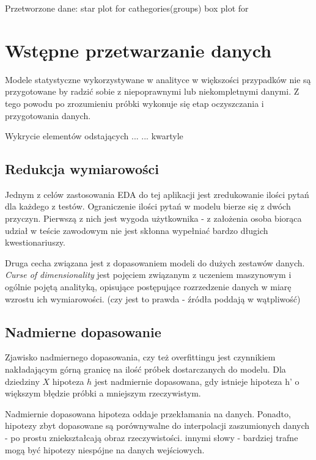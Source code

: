 \documentclass[12pt,a4paper,oneside]{report} %
\begin{document}
Przetworzone dane:
star plot for cathegories(groups)
box plot for





\section{Wstępne przetwarzanie danych}

Modele statystyczne wykorzystywane w analityce w większości przypadków nie są przygotowane by radzić sobie z niepoprawnymi lub niekompletnymi danymi. Z tego powodu po zrozumieniu próbki wykonuje się etap oczyszczania i przygotowania danych. 

Wykrycie elementów odstających ...
... kwartyle

\subsection{Redukcja wymiarowości}

Jednym z celów zastosowania EDA do tej aplikacji jest zredukowanie ilości pytań dla każdego z testów. Ograniczenie ilości pytań w modelu bierze się z dwóch przyczyn. Pierwszą z nich jest wygoda użytkownika - z założenia osoba biorąca udział w teście zawodowym nie jest skłonna wypełniać bardzo długich kwestionariuszy.

Druga cecha związana jest z dopasowaniem modeli do dużych zestawów danych. \emph{Curse of dimensionality} jest pojęciem związanym z uczeniem maszynowym i ogólnie pojętą analityką, opisujące postępujące rozrzedzenie danych w miarę wzrostu ich wymiarowości. (czy jest to prawda - źródła poddają w wątpliwość)

\subsection{Nadmierne dopasowanie}

Zjawisko nadmiernego dopasowania, czy też overfittingu jest czynnikiem nakładającym górną granicę na ilość próbek dostarczanych do modelu. Dla dziedziny $X$ hipoteza $h$ jest nadmiernie dopasowana, gdy istnieje hipoteza h' o większym błędzie próbki a mniejszym rzeczywistym.

Nadmiernie dopasowana hipoteza oddaje przekłamania na danych. Ponadto, hipotezy zbyt dopasowane są porównywalne do interpolacji zaszumionych danych - po prostu zniekształcają obraz rzeczywistości. innymi słowy - bardziej trafne mogą być hipotezy niespójne na danych wejściowych.
\end{document}
